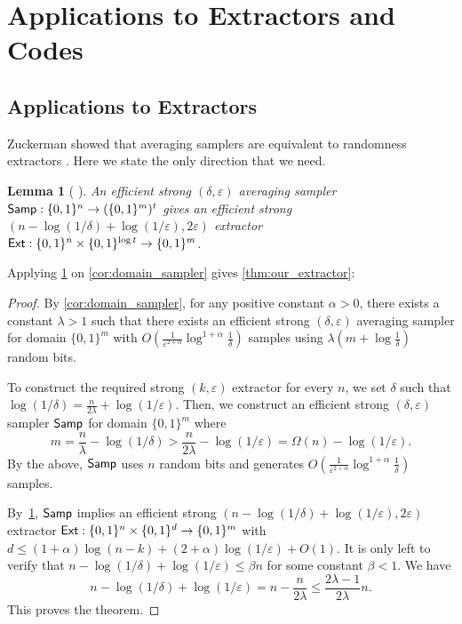 \documentclass[10pt,a4paper]{article}
\newtheorem{lemma}[theorem]{Lemma}
\newcommand{\eps}{\varepsilon}
\newcommand{\1}{\mathbbm{1}}
\newcommand{\zo}{\{0, 1\}}
\newcommand{\Ext}{\textup{\textsf{Ext}}}
\newcommand{\Smp}{\textup{\textsf{Samp}}}
\begin{document}
\section{Applications to Extractors and Codes}
\subsection{Applications to Extractors}

\label{sec:extractors}

Zuckerman showed that averaging samplers are equivalent to randomness extractors \cite{zuckerman1997randomness}. Here we state the only direction that we need.


\begin{lemma}[
\cite{zuckerman1997randomness}]
\label{lem:sampler_implies_extractor}
An efficient strong $(\delta, \eps)$ averaging sampler $\Smp : \zo^n \to (\zo^m)^t$ gives an efficient strong $ (n - \log (1 / \delta) + \log (1 / \eps), 2\eps)$ extractor $\Ext : \zo^n \times \zo^{\log t} \to \zo^m$.
\end{lemma}

Applying \cref{lem:sampler_implies_extractor} on \cref{cor:domain_sampler} gives  \cref{thm:our_extractor}:

\ourExtractor*
\begin{proof}
    By \cref{cor:domain_sampler}, for any positive constant $\alpha > 0$, there exists a constant $\lambda > 1$ such that there exists an efficient strong $(\delta, \eps)$ averaging sampler for domain $\zo^m$ with $O(\frac{1}{\eps^{2 + \alpha}} \log^{1 + \alpha} \frac{1}{\delta})$ samples using $\lambda(m + \log\frac{1}{\delta})$ random bits.

To construct the required strong $(k, \eps)$ extractor for every $n$, we set $\delta$ such that $\log(1 / \delta) = \frac{n}{2\lambda} + \log(1 / \eps)$.
Then, we construct an efficient strong $(\delta, \eps)$ sampler $\Smp$ for domain $\zo^m$ where \[
    m = \frac{n}{\lambda} - \log(1 / \delta) > \frac{n}{2\lambda} - \log(1 / \eps) = \Omega(n) - \log(1 / \eps).
\]
    By the above, $\Smp$ uses $n$ random bits and generates $O(\frac{1}{\eps^{2 + \alpha}} \log^{1 + \alpha} \frac{1}{\delta})$ samples.

By~\cref{lem:sampler_implies_extractor}, $\Smp$ implies an efficient strong $( n - \log(1 / \delta) + \log (1 / \eps), 2\eps)$ extractor $\Ext: \zo^n \times \zo^d \to \zo^m$ with $d \le (1 + \alpha)\log (n-k) + (2 + \alpha) \log (1 / \eps) + O(1)$.
It is only left to verify that $n - \log(1 / \delta) + \log(1 / \eps) \le \beta n$ for some constant $\beta < 1$. We have \[
 n - \log(1 / \delta) + \log (1 / \eps) =  n - \frac{n}{2\lambda}  \le \frac{2\lambda - 1}{2\lambda} n.
\]
This proves the theorem.
\end{proof}
\end{document}
